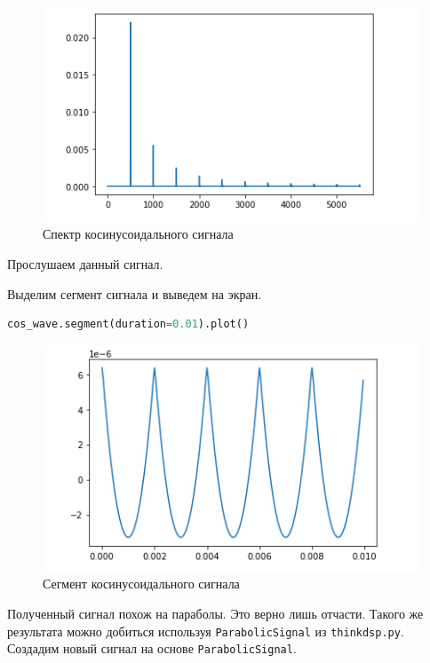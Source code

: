 \documentclass[a4paper, 14pt]{extarticle}
\begin{document}
    \begin{figure}[H]
        \centering
        \includegraphics[width=\textwidth]{cos_spectrum_plot}
        \caption{Спектр косинусоидального сигнала}
        \label{fig:cos_spectrum_plot}
    \end{figure}

    Прослушаем данный сигнал.

    Выделим сегмент сигнала и выведем на экран.

    \begin{lstlisting}[language=Python, caption= Получение сигнала, label={lst:cos_segment_plot}]
        cos_wave.segment(duration=0.01).plot()
    \end{lstlisting}

    \begin{figure}[H]
        \centering
        \includegraphics[width=\textwidth]{cos_segment}
        \caption{Сегмент косинусоидального сигнала}
        \label{fig:cos_segment}
    \end{figure}

    Полученный сигнал похож на параболы.
    Это верно лишь отчасти.
    Такого же результата можно добиться используя \texttt{ParabolicSignal} из \texttt{thinkdsp.py}.
    Создадим новый сигнал на основе \texttt{ParabolicSignal}.
\end{document}
